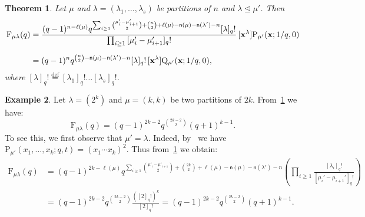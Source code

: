 \documentclass[12pt,a4paper,reqno]{amsart}
\theoremstyle{plain}
\newtheorem{theorem}{Theorem}[section]
\theoremstyle{definition}
\newtheorem{example}[theorem]{Example}
\newcommand{\defin}{\overset{\mathrm{def}}{=}}
\newcommand{\less}{\unlhd}
\newcommand{\1}{\mathds{1}}
\renewcommand{\P}{\mathrm{P}}
\newcommand{\F}{\mathrm{F}}
\newcommand{\Q}{\mathrm{Q}}
\newcommand{\x}{{\bf x}}
\newcommand{\fn}{\mathsf{n}}
\begin{document}
\begin{theorem}\label{Intro_them: Main_Macdonald}
Let $\mu$ and $\lambda=(\lambda_1,\dots,\lambda_s)$ be  partitions of $n$ and $\lambda \less \mu'$. Then
\begin{align*}
\F_{\mu\lambda}(q)&=\frac{(q-1)^{n-\ell(\mu)}q^{\sum_{i\geq 1}\binom{\mu'_i-\mu'_{i+1}}{2}+\binom{n}{2}+\ell(\mu)-\fn(\mu)-\fn(\lambda')-n}[\lambda]_q!}{\prod_{i\geq 1}{[\mu_i'-\mu_{i+1}']_q!}}\, [\x^\lambda]\P_{\mu'}(\x;1/q,0) \\[0.2cm]
&= (q-1)^n q^{\binom{n}{2} - \fn(\mu) - \fn(\lambda') - n} [\lambda]_q!\, [\x^\lambda] \Q_{\mu'}(\x; 1/q, 0),
\end{align*}
where $[\lambda]_q!\defin[\lambda_1]_q!\dots [\lambda_s]_q!$. 
\end{theorem} 



\begin{example}\label{example1} Let $\lambda=(2^k)$ and $\mu=(k,k)$ be two partitions of $2k$. From~\cref{Intro_them: Main_Macdonald} we have:
\begin{equation} \label{M-Foru:application}
\F_{\mu\lambda}(q)=(q-1)^{2k-2}q^{\binom{2k-2}{2}}(q+1)^{k-1}.
\end{equation}
To see this, we first observe that $\mu'=\lambda$.  Indeed, by~\cite[p. 325, Eq. (4.17)]{Macdonald}
we have $\P_{\mu'}(x_1,\dots,x_k; q,t)=(x_1\cdots x_k)^2$.
Thus from~\cref{Intro_them: Main_Macdonald} we obtain: 
\begin{equation*}
\begin{split}
\F_{\mu\lambda}(q) &= (q-1)^{2k-\ell(\mu)} q^{\sum_{i\geq 1}\binom{\mu'_i-\mu'_{i+1}}{2}+\binom{2k}{2}+\ell(\mu)-\fn(\mu)-\fn(\lambda')-n} \left( \prod_{i \geq 1} \frac{[\lambda_i]_q!}{[\mu_i' - \mu_{i+1}']_q!} \right)\\
&=(q-1)^{2k-2}q^{\binom{2k-2}{2}}\frac{([2]_q!)^k}{[2]_q!}=(q-1)^{2k-2}q^{\binom{2k-2}{2}}(q+1)^{k-1}.
\end{split}
\end{equation*} 
\end{example}
 
\end{document}
